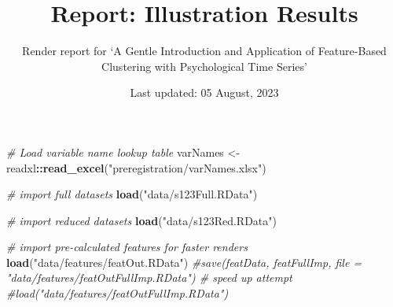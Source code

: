 \documentclass[
]{article}
\title{Report: Illustration Results}
\subtitle{Render report for `A Gentle Introduction and Application of
Feature-Based Clustering with Psychological Time Series'}
\author{}
\date{\vspace{-2.5em}Last updated: 05 August, 2023}
\newenvironment{Shaded}{\begin{snugshade}}{\end{snugshade}}
\newcommand{\CommentTok}[1]{\textcolor[rgb]{0.56,0.35,0.01}{\textit{#1}}}
\newcommand{\FunctionTok}[1]{\textcolor[rgb]{0.13,0.29,0.53}{\textbf{#1}}}
\newcommand{\NormalTok}[1]{#1}
\newcommand{\OtherTok}[1]{\textcolor[rgb]{0.56,0.35,0.01}{#1}}
\newcommand{\SpecialCharTok}[1]{\textcolor[rgb]{0.81,0.36,0.00}{\textbf{#1}}}
\newcommand{\StringTok}[1]{\textcolor[rgb]{0.31,0.60,0.02}{#1}}
\begin{document}
\maketitle

\begin{Shaded}
\begin{Highlighting}[]
\CommentTok{\# Load variable name lookup table}
\NormalTok{varNames }\OtherTok{\textless{}{-}}\NormalTok{ readxl}\SpecialCharTok{::}\FunctionTok{read\_excel}\NormalTok{(}\StringTok{"preregistration/varNames.xlsx"}\NormalTok{)}

\CommentTok{\# import full datasets}
\FunctionTok{load}\NormalTok{(}\StringTok{"data/s123Full.RData"}\NormalTok{)}

\CommentTok{\# import reduced datasets}
\FunctionTok{load}\NormalTok{(}\StringTok{"data/s123Red.RData"}\NormalTok{)}

\CommentTok{\# import pre{-}calculated features for faster renders}
\FunctionTok{load}\NormalTok{(}\StringTok{"data/features/featOut.RData"}\NormalTok{)}
\CommentTok{\#save(featData, featFullImp, file = "data/features/featOutFullImp.RData") \# speed up attempt }
\CommentTok{\#load("data/features/featOutFullImp.RData")}
\end{Highlighting}
\end{Shaded}
\end{document}
